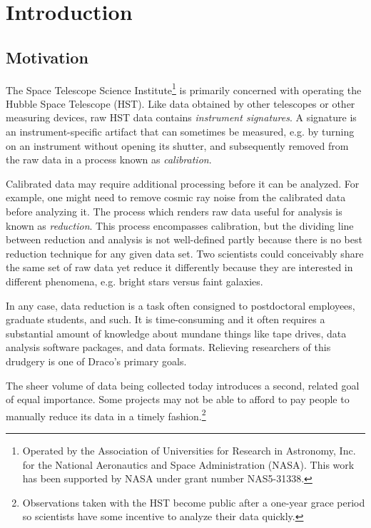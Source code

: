 \section{Introduction}

\subsection{Motivation}

The Space Telescope Science Institute\footnote{Operated by the Association
of Universities for Research in Astronomy, Inc. for the National Aeronautics
and Space Administration (NASA).  This work has been supported by NASA under
grant number NAS5-31338.} is primarily concerned with operating the Hubble
Space Telescope (HST).  Like data obtained by other telescopes or other
measuring devices, raw HST data contains {\it instrument signatures}.
A signature is an instrument-specific artifact that can sometimes be measured,
e.g. by turning on an instrument without opening its shutter, and subsequently
removed from the raw data in a process known as {\it calibration}.

Calibrated data may require additional processing before it can be analyzed.
For example, one might need to remove cosmic ray noise from the calibrated
data before analyzing it.  The process which renders raw data useful for
analysis is known as {\it reduction}.  This process encompasses calibration,
but the dividing line between reduction and analysis is not well-defined
partly because there is no best reduction technique for any given data set.
Two scientists could conceivably share the same set of raw data yet reduce it
differently because they are interested in different phenomena, e.g. bright
stars versus faint galaxies.

In any case, data reduction is a task often consigned to postdoctoral
employees, graduate students, and such.  It is time-consuming and it often
requires a substantial amount of knowledge about mundane things like tape
drives, data analysis software packages, and data formats.  Relieving
researchers of this drudgery is one of Draco's primary goals.

The sheer volume of data being collected today introduces a second, related
goal of equal importance.  Some projects may not be able to afford to pay
people to manually reduce its data in a timely fashion.\footnote{Observations
taken with the HST become public after a one-year grace period so scientists
have some incentive to analyze their data quickly.}

